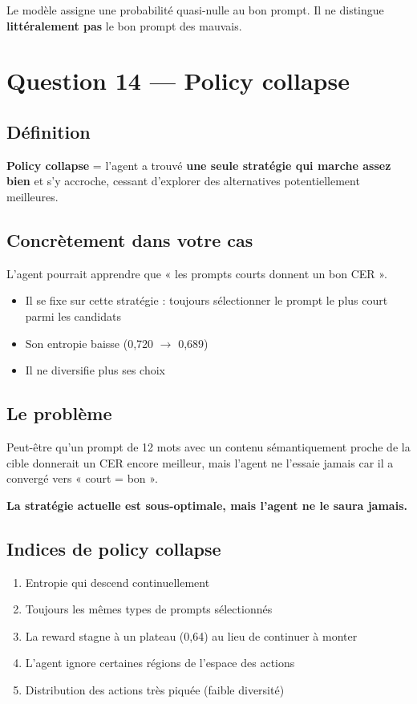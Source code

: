 \documentclass[11pt,a4paper]{article}
\begin{document}
Le modèle assigne une probabilité quasi-nulle au bon prompt. Il ne distingue \textbf{littéralement pas} le bon prompt des mauvais.

\section{Question 14 — Policy collapse}

\subsection{Définition}

\textbf{Policy collapse} = l'agent a trouvé \textbf{une seule stratégie qui marche assez bien} et s'y accroche, cessant d'explorer des alternatives potentiellement meilleures.

\subsection{Concrètement dans votre cas}

L'agent pourrait apprendre que « les prompts courts donnent un bon CER ». 

\begin{itemize}
    \item Il se fixe sur cette stratégie : toujours sélectionner le prompt le plus court parmi les candidats
    \item Son entropie baisse (0{,}720 $\rightarrow$ 0{,}689)
    \item Il ne diversifie plus ses choix
\end{itemize}

\subsection{Le problème}

Peut-être qu'un prompt de 12 mots avec un contenu sémantiquement proche de la cible donnerait un CER encore meilleur, mais l'agent ne l'essaie jamais car il a convergé vers « court = bon ».

\textbf{La stratégie actuelle est sous-optimale, mais l'agent ne le saura jamais.}

\subsection{Indices de policy collapse}

\begin{enumerate}
    \item Entropie qui descend continuellement
    \item Toujours les mêmes types de prompts sélectionnés
    \item La reward stagne à un plateau (0{,}64) au lieu de continuer à monter
    \item L'agent ignore certaines régions de l'espace des actions
    \item Distribution des actions très piquée (faible diversité)
\end{enumerate}
\end{document}
